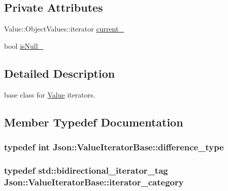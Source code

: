\subsection*{Private Attributes}
\begin{DoxyCompactItemize}
\item 
Value\+::\+Object\+Values\+::iterator \hyperlink{classJson_1_1ValueIteratorBase_ab3138ce8af8301cca3b041ea55cb922a}{current\+\_\+}
\item 
bool \hyperlink{classJson_1_1ValueIteratorBase_a3e08b114a1aed9bde518c527f94a8c59}{is\+Null\+\_\+}
\end{DoxyCompactItemize}


\subsection{Detailed Description}
base class for \hyperlink{classJson_1_1Value}{Value} iterators. 

\subsection{Member Typedef Documentation}
\subsubsection[{\texorpdfstring{difference\+\_\+type}{difference_type}}]{\setlength{\rightskip}{0pt plus 5cm}typedef int {\bf Json\+::\+Value\+Iterator\+Base\+::difference\+\_\+type}}\hypertarget{classJson_1_1ValueIteratorBase_a4e44bf8cbd17ec8d6e2c185904a15ebd}{}\label{classJson_1_1ValueIteratorBase_a4e44bf8cbd17ec8d6e2c185904a15ebd}
\subsubsection[{\texorpdfstring{iterator\+\_\+category}{iterator_category}}]{\setlength{\rightskip}{0pt plus 5cm}typedef std\+::bidirectional\+\_\+iterator\+\_\+tag {\bf Json\+::\+Value\+Iterator\+Base\+::iterator\+\_\+category}}\hypertarget{classJson_1_1ValueIteratorBase_a02fd11a4fbdc0007da1e8bcf5e6b83c3}{}\label{classJson_1_1ValueIteratorBase_a02fd11a4fbdc0007da1e8bcf5e6b83c3}

